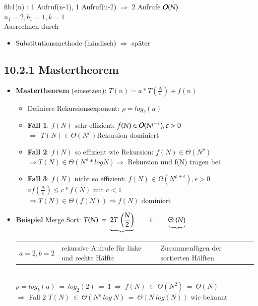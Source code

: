 fib1(n) : 1 Aufruf(n-1), 1 Aufruf(n-2) $\Rightarrow$ 2 Aufrufe $\mathcal{O}{}(N)$ \\
\hspace*{5cm} $n_1 = 2, b_1 = 1, k = 1$ \\
Ausrechnen durch
\begin{itemize}
    \item Substitutionsmethode (\glqq händisch\grqq) $\Rightarrow$ später
\end{itemize}
    \subsection*{10.2.1 Mastertheorem}
    \begin{itemize}
    \item \textbf{Mastertheorem} (einsetzen): $T(n) = a* T\left(\frac{N}{b}\right) + f(n)$
    \begin{itemize}[label={}]
        \item Definiere Rekursionsexponent: $\rho = log_b(a)$
        \item \textbf{Fall 1}: $f(N)$ sehr effizient: $f(N) \in \mathcal{O}{}(N^{\rho-\epsilon}), \epsilon > 0$ \\
        $\Rightarrow$ $T(N) \in \Theta(N^\rho)$Rekursion dominiert
        \item \textbf{Fall 2}: $f(N)$ so effizient wie Rekursion: $f(N) \in \Theta(N^\rho)$ \\
        $\Rightarrow T(N) \in \Theta(N^\rho * logN) \Rightarrow$ Rekursion und f(N) tragen bei
        \item \textbf{Fall 3}: $f(N)$ nicht so effizient: $f(N) \in \Omega(N^{\rho + \epsilon}), \epsilon > 0$ \\
        \hspace*{5cm} $a f\left(\frac{N}{b}\right) \leq c* f(N)$ mit $c < 1$ \\
        $\Rightarrow T(N) \in \Theta(f(N)) \Rightarrow f(N)$ dominiert
    \end{itemize}
    \item \textbf{Beispiel} Merge Sort: $T(N)\ =\ \underbrace{2 T \ \left(\frac{N}{2}\right)}\hspace*{0.7cm} +\hspace*{0.7cm} \underbrace{\Theta\ (N)}$\\
    \begin{tabular}{L{4cm} L{3cm} L{3cm}}
        $a=2, b=2$ & rekursive Aufrufe für linke und rechte Hälfte & Zusammenfügen der sortierten Hälften\\
    \end{tabular}\\
    \hspace*{1cm} $\rho = log_b(a) \ = \ log_2(2) \ = \ 1 \ \Rightarrow \ f(N)\ \in \ \Theta(N^2) \ = \ \Theta(N)$\\
    $\Rightarrow$ Fall 2  \hspace*{1cm} $T(N)\  \in\  \Theta(N^{\rho}\ log\ N)\ =\ \boxed{\Theta(N\ log(N))}$ wie bekannt
\end{itemize}

